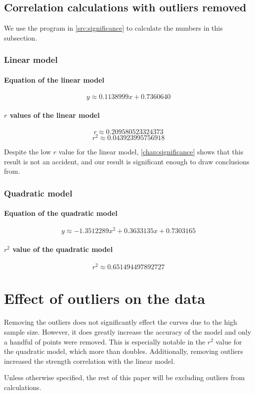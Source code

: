 \subsection{Correlation calculations with outliers removed}
We use the program in \vref{src:significance} to calculate the numbers in this subsection.

\subsubsection{Linear model}
\paragraph{Equation of the linear model}
\[y \approx \num{0.1138999}x + \num{0.7360640}\]
\paragraph{$r$ values of the linear model}
\[r \approx \num{0.209580523324373}\]
\[r^2 \approx \num{0.043923995756918}\]

Despite the low $r$ value for the linear model, \vref{chap:significance} shows that this result is not an accident, and our result is significant enough to draw conclusions from.

\subsubsection{Quadratic model}
\paragraph{Equation of the quadratic model}
\[y \approx \num{-1.3512289}x^2 + \num{0.3633135}x + \num{0.7303165}\]
\paragraph{$r^2$ value of the quadratic model}
\[r^2 \approx \num{0.651494497892727}\]

\section{Effect of outliers on the data}
Removing the outliers does not significantly effect the curves due to the high sample size.
However, it does greatly increase the accuracy of the model and only a handful of points were removed.
This is especially notable in the $r^2$ value for the quadratic model, which more than doubles.
Additionally, removing outliers increased the strength correlation with the linear model.

Unless otherwise specified, the rest of this paper will be excluding outliers from calculations.

